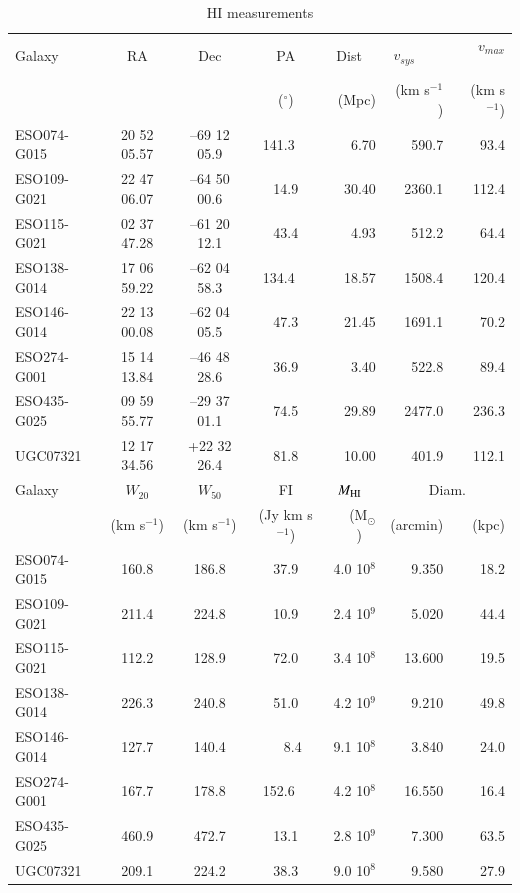 \documentclass[traditabstract]{aa} %
\begin{document}
\begin{table}[t] %
\centering
\caption[HI measurements]{HI measurements}
\label{tab:meas-HI}
\begin{tabular}{lcccrrr}
\hline
Galaxy & RA & Dec & PA & Dist\ \  & $v_{sys}$\ \ \ \  & $v_{max}$\ \ \ \ \\
& & & ($^{\circ}$) & (Mpc) & (km s$^{-1}$) & (km s$^{-1}$)  \\
\hline\hline
ESO074-G015 & 20 52 05.57 & --69 12 05.9 & 141.3\ \  &   6.70 &  590.7 &  93.4 \\
ESO109-G021 & 22 47 06.07 & --64 50 00.6 & 14.9  &  30.40 & 2360.1 & 112.4 \\
ESO115-G021 & 02 37 47.28 & --61 20 12.1 & 43.4  &   4.93 &  512.2 &  64.4 \\
ESO138-G014 & 17 06 59.22 & --62 04 58.3 & 134.4\ \  &  18.57 & 1508.4 & 120.4 \\
ESO146-G014 & 22 13 00.08 & --62 04 05.5 & 47.3  &  21.45 & 1691.1 &  70.2 \\
ESO274-G001 & 15 14 13.84 & --46 48 28.6 & 36.9  &   3.40 &  522.8 &  89.4 \\
ESO435-G025 & 09 59 55.77 & --29 37 01.1 & 74.5  &  29.89 & 2477.0 & 236.3 \\
UGC07321    & 12 17 34.56 & +22 32 26.4 & 81.8  &  10.00 &  401.9 & 112.1 \\
\hline\hline
Galaxy & $W_{20}$ & $W_{50}$ & FI & $M_{\rm HI}$\ \  & \multicolumn{2}{c}{Diam.} \\
 & (km s$^{-1}$) & (km s$^{-1}$) & (Jy km s$^{-1}$) & (M$_{\odot}$)\ \  & (arcmin) & (kpc) \\
\hline\hline
ESO074-G015 & 160.8 & 186.8 &  37.9 & 4.0 10$^{8}$ &   9.350 & 18.2 \\
ESO109-G021 & 211.4 & 224.8 &  10.9 & 2.4 10$^{9}$ &   5.020 & 44.4 \\
ESO115-G021 & 112.2 & 128.9 &  72.0 & 3.4 10$^{8}$ &  13.600 & 19.5 \\
ESO138-G014 & 226.3 & 240.8 &  51.0 & 4.2 10$^{9}$ &   9.210 & 49.8 \\
ESO146-G014 & 127.7 & 140.4 &  \ \ 8.4 & 9.1 10$^{8}$ &   3.840 & 24.0 \\
ESO274-G001 & 167.7 & 178.8 & 152.6\ \  & 4.2 10$^{8}$ &  16.550 & 16.4 \\
ESO435-G025 & 460.9 & 472.7 &  13.1 & 2.8 10$^{9}$ &   7.300 & 63.5 \\
UGC07321    & 209.1 & 224.2 &  38.3 & 9.0 10$^{8}$ &   9.580 & 27.9 \\
\hline
\end{tabular}
\end{table}
\end{document}
